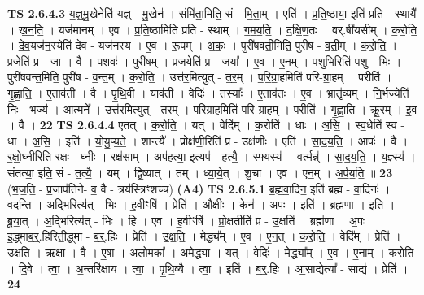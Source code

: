 \documentclass[17pt]{extarticle}
\begin{document}
                  \newline
                                \textbf{ TS 2.6.4.3} \newline
                  य॒ज्ञ्॒मु॒खेनेति॑ यज्ञ् - मु॒खेन॑ । संमि॑ता॒मिति॒ सं - मि॒ता॒म् । एति॑ । प्र॒ति॒ष्ठाया॒ इति॑ प्रति - स्थायै᳚ । ख॒न॒ति॒ । यज॑मानम् । ए॒व । प्र॒ति॒ष्ठामिति॑ प्रति - स्थाम् । ग॒म॒य॒ति॒ । द॒क्षि॒ण॒तः । वर्.षी॑यसीम् । क॒रो॒ति॒ । दे॒व॒यज॑न॒स्येति॑ देव - यज॑नस्य । ए॒व । रू॒पम् । अ॒कः॒ । पुरी॑षवती॒मिति॒ पुरी॑ष - व॒ती॒म् । क॒रो॒ति॒ । प्र॒जेति॑ प्र - जा । वै । प॒शवः॑ । पुरी॑षम् । प्र॒जयेति॑ प्र - जया᳚ । ए॒व । ए॒न॒म् । प॒शुभि॒रिति॑ प॒शु - भिः॒ । पुरी॑षवन्त॒मिति॒ पुरी॑ष - व॒न्त॒म् । क॒रो॒ति॒ । उत्त॑र॒मित्युत् - त॒र॒म् । प॒रि॒ग्रा॒हमिति॑ परि-ग्रा॒हम् । परीति॑ । गृ॒ह्णा॒ति॒ । ए॒ताव॑ती । वै । पृ॒थि॒वी । याव॑ती । वेदिः॑ । तस्याः᳚ । ए॒ताव॑तः । ए॒व । भ्रातृ॑व्यम् । नि॒र्भज्येति॑ निः - भज्य॑ । आ॒त्मने᳚ । उत्त॑र॒मित्युत् - त॒र॒म् । प॒रि॒ग्रा॒हमिति॑ परि-ग्रा॒हम् । परीति॑ । गृ॒ह्णा॒ति॒ । क्रू॒रम् । इ॒व॒ । वै । \textbf{  22} \newline
                  \newline
                                \textbf{ TS 2.6.4.4} \newline
                  ए॒तत् । क॒रो॒ति॒ । यत् । वेदि᳚म् । क॒रोति॑ । धाः । अ॒सि॒ । स्व॒धेति॑ स्व - धा । अ॒सि॒ । इति॑ । यो॒यु॒प्य॒ते॒ । शान्त्यै᳚ । प्रोक्ष॑णी॒रिति॑ प्र - उक्ष॑णीः । एति॑ । सा॒द॒य॒ति॒ । आपः॑ । वै । र॒क्षो॒घ्नीरिति॑ रक्षः - घ्नीः । रक्ष॑साम् । अप॑हत्या॒ इत्यप॑ - ह॒त्यै॒ । स्फ्यस्य॑ । वर्त्मन्न्॑ । सा॒द॒य॒ति॒ । य॒ज्ञ्स्य॑ । संत॑त्या॒ इति॒ सं - त॒त्यै॒ । यम् । द्वि॒ष्यात् । तम् । ध्या॒ये॒त् । शु॒चा । ए॒व । ए॒न॒म् । अ॒र्प॒य॒ति॒ ॥ \textbf{  23} \newline
                  \newline
                      (भ॒ज॒ति॒ - प्र॒जाप॑तिने- व॒ वै - त्रय॑स्त्रिꣳशच्च)  \textbf{(A4)} \newline \newline
                                \textbf{ TS 2.6.5.1} \newline
                  ब्र॒ह्म॒वा॒दिन॒ इति॑ ब्रह्म - वा॒दिनः॑ । व॒द॒न्ति॒ । अ॒द्भिरित्य॑त् - भिः । ह॒वीꣳषि॑ । प्रेति॑ । औ॒क्षीः॒ । केन॑ । अ॒पः । इति॑ । ब्रह्म॑णा । इति॑ । ब्रू॒या॒त् । अ॒द्भिरित्य॑त् - भिः । हि । ए॒व । ह॒वीꣳषि॑ । प्रो॒क्षतीति॑ प्र - उ॒क्षति॑ । ब्रह्म॑णा । अ॒पः । इ॒द्ध्माब॒र्॒.हिरिती॒द्ध्मा - ब॒र्॒.हिः । प्रेति॑ । उ॒क्ष॒ति॒ । मेद्ध्य᳚म् । ए॒व । ए॒न॒त् । क॒रो॒ति॒ । वेदि᳚म् । प्रेति॑ । उ॒क्ष॒ति॒ । ऋ॒क्षा । वै । ए॒षा । अ॒लो॒मका᳚ । अ॒मे॒द्ध्या । यत् । वेदिः॑ । मेद्ध्या᳚म् । ए॒व । ए॒ना॒म् । क॒रो॒ति॒ । दि॒वे । त्वा॒ । अ॒न्तरि॑क्षाय । त्वा॒ । पृ॒थि॒व्यै । त्वा॒ । इति॑ । ब॒र्॒.हिः । आ॒साद्येत्या᳚ - साद्य॑ । प्रेति॑ । \textbf{  24} \newline
\end{document}
